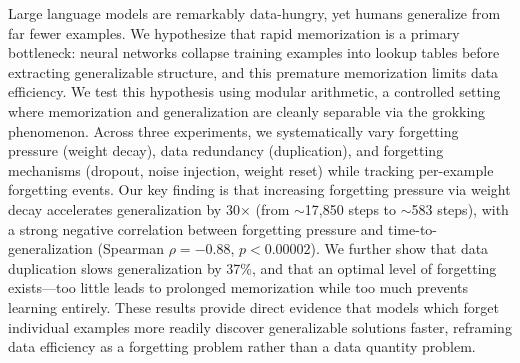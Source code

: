 Large language models are remarkably data-hungry, yet humans generalize from far fewer examples. We hypothesize that rapid memorization is a primary bottleneck: neural networks collapse training examples into lookup tables before extracting generalizable structure, and this premature memorization limits data efficiency. We test this hypothesis using modular arithmetic, a controlled setting where memorization and generalization are cleanly separable via the grokking phenomenon. Across three experiments, we systematically vary forgetting pressure (weight decay), data redundancy (duplication), and forgetting mechanisms (dropout, noise injection, weight reset) while tracking per-example forgetting events. Our key finding is that increasing forgetting pressure via weight decay accelerates generalization by 30$\times$ (from ${\sim}$17,850 steps to ${\sim}$583 steps), with a strong negative correlation between forgetting pressure and time-to-generalization (Spearman $\rho = -0.88$, $p < 0.00002$). We further show that data duplication slows generalization by 37\%, and that an optimal level of forgetting exists---too little leads to prolonged memorization while too much prevents learning entirely. These results provide direct evidence that models which forget individual examples more readily discover generalizable solutions faster, reframing data efficiency as a forgetting problem rather than a data quantity problem.
